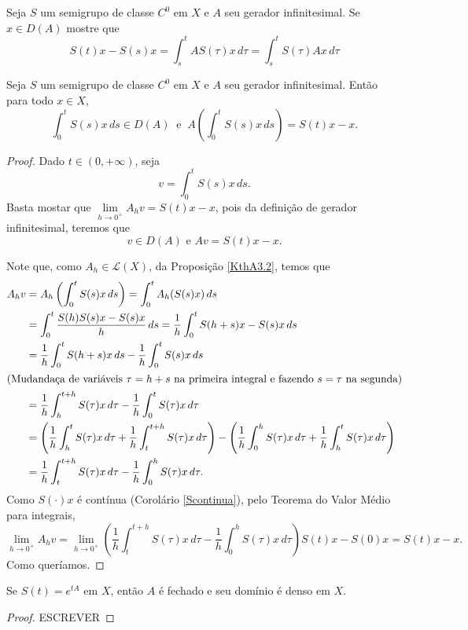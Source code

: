 \begin{xca}
Seja $S$ um semigrupo de classe $C^0$ em $X$ e $A$ seu gerador infinitesimal. Se $x\in D(A)$ mostre que
\[S(t)x-S(s)x=\int_s^t AS(\tau)x\,d\tau =\int_s^t S(\tau)Ax\,d\tau\] 
\end{xca}

\begin{proposition}
Seja $S$ um semigrupo de classe $C^0$ em $X$ e $A$ seu gerador infinitesimal. Então para todo $x\in X$, 
\[\int_0^tS(s)x\,ds\in D(A)\ \text{ e }\ A\left(\int_0^t S(s)x\,ds\right)=S(t)x-x.\]
\end{proposition}
\begin{proof}
   Dado $t\in (0,+\infty)$, seja 
\begin{equation*}
v=\int_0^t S(s)x\, ds.
\end{equation*}
Basta mostar que $\lim\limits_{h\to 0^+} A_hv=S(t)x-x$, pois da definição de gerador infinitesimal, teremos que
\[v\in D(A) \text{ e } Av=S(t)x-x.\]

Note que, como $A_h \in \mathcal{L}(X)$, da Proposição \ref{KthA3.2}, temos que
\begin{align*}
A_hv& =A_h\left(\int_0^t S(s)x\,ds\right)=\int_0^t A_h(S(s)x)\,ds\\
& =\int_0^t \frac{S(h)S(s)x-S(s)x}{h}\,ds
= \frac{1}{h}\int_0^t S(h+s)x-S(s)x\,ds\\
&= \frac{1}{h}\int_0^t S(h+s)x\,ds- \frac{1}{h}\int_0^t S(s)x\,ds\\
\shortintertext{(Mudandaça de variáveis $\tau=h+s$ na primeira integral e fazendo $s=\tau$ na segunda)}
&=\frac{1}{h}\int_h^{t+h} S(\tau)x\,d\tau- \frac{1}{h}\int_0^t S(\tau)x\,d\tau\\
&=\left(\frac{1}{h}\int_h^{t} S(\tau)x\,d\tau+\frac{1}{h}\int_t^{t+h} S(\tau)x\,d\tau\right) -
 \left(\frac{1}{h}\int_0^h S(\tau)x\,d\tau+\frac{1}{h}\int_h^t S(\tau)x\,d\tau\right)\\
&=\frac{1}{h}\int_t^{t+h} S(\tau)x\,d\tau-\frac{1}{h}\int_0^h S(\tau)x\,d\tau.
\end{align*}
Como $S(\cdot)x$ é contínua (Corolário \ref{Scontinua}), pelo Teorema do Valor Médio para integrais, 
\begin{equation*}
\lim\limits_{h\to 0^+} A_hv =\lim\limits_{h\to 0^+} \left(\frac{1}{h}\int_t^{t+h} S(\tau)x\,d\tau-\frac{1}{h}\int_0^h S(\tau)x\,d\tau\right) S(t)x-S(0)x=S(t)x-x.
\end{equation*}
Como queríamos.
\end{proof}

\begin{proposition}
    Se $S(t)=e^{tA}$ em $X$, então $A$ é fechado e seu domínio é denso em $X$.
\end{proposition}
\begin{proof}
    {\color{red} ESCREVER}
\end{proof}

